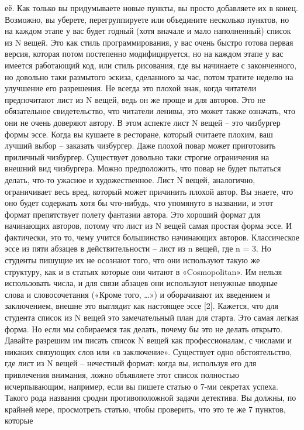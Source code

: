 \documentclass[ebook,12pt,oneside,openany]{memoir}
\begin{document}
её. Как только вы придумываете новые пункты, вы просто добавляете их в
конец. Возможно, вы уберете, перегруппируете или объедините несколько
пунктов, но на каждом этапе у вас будет годный (хотя вначале и мало
наполненный) список из N вещей. Это как стиль программирования, у вас
очень быстро готова первая версия, которая потом постепенно
модифицируется, но на каждом этапе у вас имеется работающий код, или
стиль рисования, где вы начинаете с законченного, но довольно таки
размытого эскиза, сделанного за час, потом тратите неделю на улучшение
его разрешения. Не всегда это плохой знак, когда читатели предпочитают
лист из N вещей, ведь он же проще и для авторов. Это не обязательное
свидетельство, что читатели ленивы, это может также означать, что они
не очень доверяют автору. В этом аспекте лист N вещей – это чизбургер
формы эссе. Когда вы кушаете в ресторане, который считаете плохим, ваш
лучший выбор – заказать чизбургер. Даже плохой повар может приготовить
приличный чизбургер. Существует довольно таки строгие ограничения на
внешний вид чизбургера. Можно предположить, что повар не будет
пытаться делать, что-то ужасное и художественное. Лист N вещей,
аналогично, ограничивает весь вред, который может причинить плохой
автор. Вы знаете, что оно будет содержать хотя бы что-нибудь, что
упомянуто в названии, и этот формат препятствует полету фантазии
автора. Это хороший формат для начинающих авторов, потому что лист из
N вещей самая простая форма эссе. И фактически, это то, чему учится
большинство начинающих авторов. Классическое эссе из пяти абзацев в
действительности – лист из n вещей, где n = 3. Но студенты пишущие их
не осознают того, что они используют такую же структуру, как и в
статьях которые они читают в «Cosmopolitan». Им нельзя использовать
числа, и для связи абзацев они используют ненужные вводные слова и
словосочетания («Кроме того, …») и оборачивают их введением и
заключением, внешне это выглядит как настоящее эссе [2]. Кажется, что
для студента список из N вещей это замечательный план для старта. Это
самая легкая форма. Но если мы собираемся так делать, почему бы это не
делать открыто. Давайте разрешим им писать список N вещей как
профессионалам, с числами и никаких связующих слов или «в заключение».
Существует одно обстоятельство, где лист из N вещей – нечестный
формат: когда вы, используя его для привлечения внимания, ложно
объявляете этот список полностью исчерпывающим, например, если вы
пишете статью о 7-ми секретах успеха. Такого рода названия сродни
противоположной задачи детектива. Вы должны, по крайней мере,
просмотреть статью, чтобы проверить, что это те же 7 пунктов, которые
\end{document}
